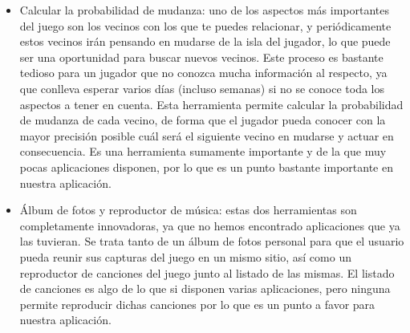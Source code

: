 \begin{itemize}
	\item Calcular la probabilidad de mudanza: uno de los aspectos más importantes del juego son los vecinos con los que te puedes relacionar, y periódicamente estos vecinos irán pensando en mudarse de la isla del jugador, lo que puede ser una oportunidad para buscar nuevos vecinos. Este proceso es bastante tedioso para un jugador que no conozca mucha información al respecto, ya que conlleva esperar varios días (incluso semanas) si no se conoce toda los aspectos a tener en cuenta. Esta herramienta permite calcular la probabilidad de mudanza de cada vecino, de forma que el jugador pueda conocer con la mayor precisión posible cuál será el siguiente vecino en mudarse y actuar en consecuencia. Es una herramienta sumamente importante y de la que muy pocas aplicaciones disponen, por lo que es un punto bastante importante en nuestra aplicación.
	
	\item Álbum de fotos y reproductor de música: estas dos herramientas son completamente innovadoras, ya que no hemos encontrado aplicaciones que ya las tuvieran. Se trata tanto de un álbum de fotos personal para que el usuario pueda reunir sus capturas del juego en un mismo sitio, así como un reproductor de canciones del juego junto al listado de las mismas. El listado de canciones es algo de lo que si disponen varias aplicaciones, pero ninguna permite reproducir dichas canciones por lo que es un punto a favor para nuestra aplicación.
	
\end{itemize}








 